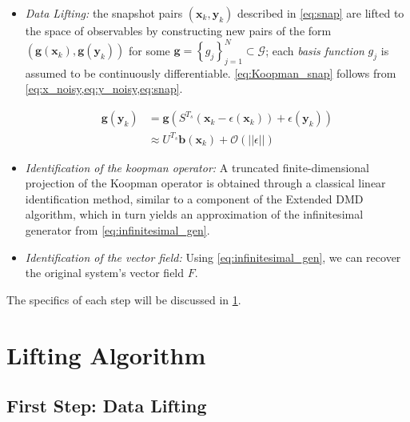 \documentclass{article}
\begin{document}
        \begin{itemize}
            \item \textit{Data Lifting:} the snapshot pairs $\left(\mathbf{x}_k,\mathbf{y}_k\right)$ described in \cref{eq:snap} are lifted to the space of observables by constructing new pairs of the form $\left(\mathbf{g}\left(\mathbf{x}_k\right),\mathbf{g}\left(\mathbf{y}_k\right)\right)$ for some $\mathbf{g} = \left\{g_j\right\}_{j=1}^{N} \subset \mathcal{G}$; each \textit{basis function} $g_j$ is assumed to be continuously differentiable. \cref{eq:Koopman_snap} follows from \cref{eq:x_noisy,eq:y_noisy,eq:snap}.
            
            \begin{align} \label{eq:Koopman_snap}
                \mathbf{g} \left(\mathbf{y}_k\right) &= \mathbf{g} \left(S^{T_s} \left(\mathbf{x}_k - \epsilon\left(\mathbf{x}_k\right)\right) + \epsilon\left(\mathbf{y}_k\right)\right)
                \\
                & \approx U^{T_s} \mathbf{b}\left(\mathbf{x}_k\right) + \mathcal{O} \left(\left|\left|\epsilon\right|\right|\right)
            \end{align}

            \item \textit{Identification of the koopman operator:} A truncated finite-dimensional projection of the Koopman operator is obtained through a classical linear identification method, similar to a component of the Extended DMD algorithm\cite{EDMD}, which in turn yields an approximation of the infinitesimal generator from \ref{eq:infinitesimal_gen}.
            
            \item \textit{Identification of the vector field:} Using \ref{eq:infinitesimal_gen}, we can recover the original system's vector field $F$.
        \end{itemize}

        The specifics of each step will be discussed in \cref{sec:algorithm}.

\section{Lifting Algorithm} \label{sec:algorithm}

    \subsection{First Step: Data Lifting}
\end{document}
